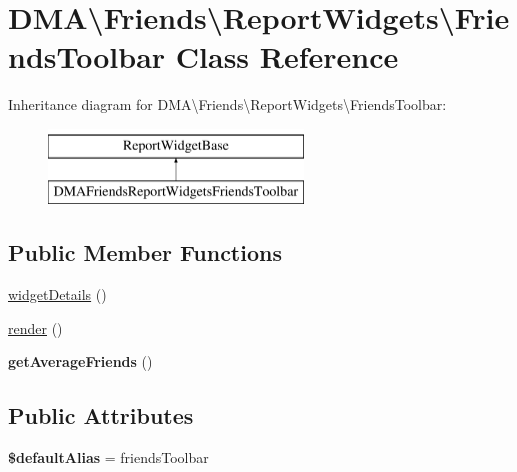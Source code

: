 \hypertarget{classDMA_1_1Friends_1_1ReportWidgets_1_1FriendsToolbar}{}\section{D\+M\+A\textbackslash{}Friends\textbackslash{}Report\+Widgets\textbackslash{}Friends\+Toolbar Class Reference}
\label{classDMA_1_1Friends_1_1ReportWidgets_1_1FriendsToolbar}
Inheritance diagram for D\+M\+A\textbackslash{}Friends\textbackslash{}Report\+Widgets\textbackslash{}Friends\+Toolbar\+:\begin{figure}[H]
\begin{center}
\leavevmode
\includegraphics[height=2.000000cm]{d4/d8c/classDMA_1_1Friends_1_1ReportWidgets_1_1FriendsToolbar}
\end{center}
\end{figure}
\subsection*{Public Member Functions}
\begin{DoxyCompactItemize}
\item 
\hyperlink{classDMA_1_1Friends_1_1ReportWidgets_1_1FriendsToolbar_a56951946e166c46353910da4a5c399a1}{widget\+Details} ()
\item 
\hyperlink{classDMA_1_1Friends_1_1ReportWidgets_1_1FriendsToolbar_a5fb3de1ff5dd5186e068dcf8c5e8d154}{render} ()
\item 
\hypertarget{classDMA_1_1Friends_1_1ReportWidgets_1_1FriendsToolbar_a6f0b603938f9468c37716f2aab808e62}{}{\bfseries get\+Average\+Friends} ()\label{classDMA_1_1Friends_1_1ReportWidgets_1_1FriendsToolbar_a6f0b603938f9468c37716f2aab808e62}

\end{DoxyCompactItemize}
\subsection*{Public Attributes}
\begin{DoxyCompactItemize}
\item 
\hypertarget{classDMA_1_1Friends_1_1ReportWidgets_1_1FriendsToolbar_aabef17c5a99fc5f66554a91dd2cde59d}{}{\bfseries \$default\+Alias} = \textquotesingle{}friends\+Toolbar\textquotesingle{}\label{classDMA_1_1Friends_1_1ReportWidgets_1_1FriendsToolbar_aabef17c5a99fc5f66554a91dd2cde59d}

\end{DoxyCompactItemize}


